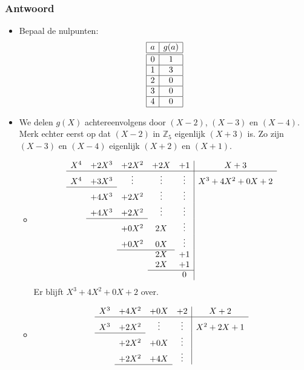 \documentclass[main.tex]{subfiles}
\begin{document}
\subsubsection*{Antwoord}
\begin{itemize}
\item Bepaal de nulpunten:
  \[
  \begin{array}{|c|c|}
    \hline
    a & g(a)\\
    \hline
    \hline
    0 & 1\\ \hline
    1 & 3\\ \hline
    2 & 0\\ \hline
    3 & 0\\ \hline
    4 & 0\\ \hline
  \end{array}
  \]
\item We delen $g(X)$ achtereenvolgens door $(X-2)$, $(X-3)$ en $(X-4)$.
  Merk echter eerst op dat $(X-2)$ in $\mathbb{Z}_{5}$ eigenlijk $(X+3)$ is.
  Zo zijn $(X-3)$ en $(X-4)$ eigenlijk $(X+2)$ en $(X+1)$.
  \begin{itemize}
  \item 
    \[
    \begin{array}{ccccc|c}
      X^{4} &+2X^{3} &+2X^{2} &+2X    &+1     & X+3\\\hline
      X^{4} &+3X^{3} &\vdots &\vdots &\vdots & X^{3}+4X^{2}+0X+2\\\cline{1-2}
      &+4X^{3} & +2X^{2} &\vdots &\vdots &\\
      &+4X^{3} & +2X^{2} &\vdots &\vdots &\\\cline{2-3}
      &       & +0X^{2} & 2X    &\vdots &\\
      &       & +0X^{2} & 0X    &\vdots &\\\cline{3-4}
      &       &        & 2X    &+1     &\\
      &       &        & 2X    &+1     &\\\cline{4-5}
      &       &        &       & 0     &
    \end{array}
    \]
    Er blijft $X^{3}+4X^{2}+0X+2$ over.
  \item 
    \[
    \begin{array}{cccc|c}
      X^{3} &+4X^{2} &+0X    &+2       & X+2\\\hline
      X^{3} &+2X^{2} &\vdots &\vdots   & X^{2}+2X+1\\\cline{1-2}
           &+2X^{2} &+0X    &\vdots   &\\
           &+2X^{2} &+4X    &\vdots   &\\\cline{2-3}

\end{array}\]
\end{itemize}
\end{itemize}
\end{document}
